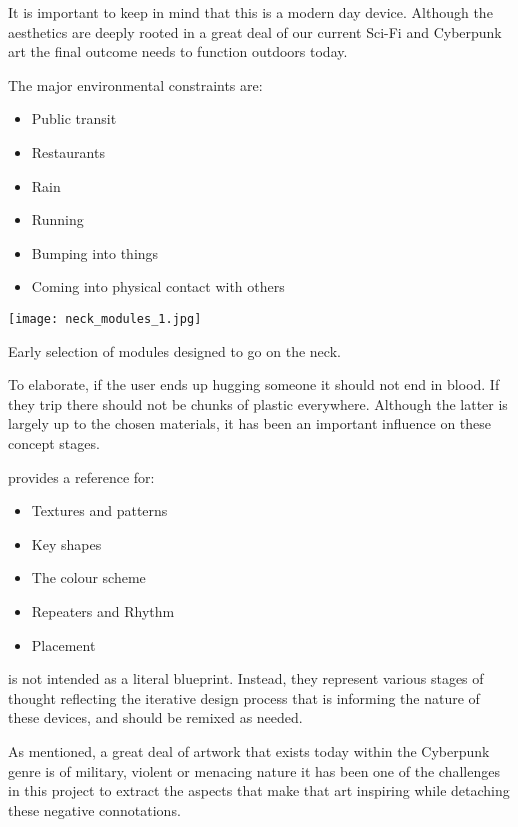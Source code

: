 It is important to keep in mind that this is a modern day device. Although the aesthetics are deeply rooted in a great deal of our current Sci-Fi and Cyberpunk art the final outcome needs to function outdoors today.

The major environmental constraints are:

\begin{itemize}
  \item Public transit
  \item Restaurants
  \item Rain
  \item Running
  \item Bumping into things
  \item Coming into physical contact with others
\end{itemize}

\begin{marginfigure}
  \texttt{[image: neck\_modules\_1.jpg]}
  \caption{Early selection of modules designed to go on the neck.}
  \label{fig:neckmodules}
\end{marginfigure}

To elaborate, if the user ends up hugging someone it should not end in blood. If they trip there should not be chunks of plastic everywhere. Although the latter is largely up to the chosen materials, it has been an important influence on these concept stages.

 provides a reference for:

\begin{itemize}
  \item Textures and patterns
  \item Key shapes
  \item The colour scheme
  \item Repeaters and Rhythm
  \item Placement
\end{itemize}

 is not intended as a literal blueprint. Instead, they represent various stages of thought reflecting the iterative design process that is informing the nature of these devices, and should be remixed as needed.

As mentioned, a great deal of artwork that exists today within the Cyberpunk genre is of military, violent or menacing nature it has been one of the challenges in this project to extract the aspects that make that art inspiring while detaching these negative connotations.

